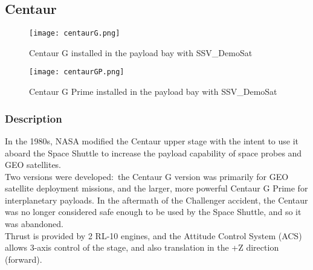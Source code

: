 \documentclass[Space_Shuttle_Vessel_Manual.tex]{subfiles}
\begin{document}
\subsection{Centaur}
\begin{multicols*}{2}
\renewcommand{\cfttoctitlefont}{\bf}
\localtableofcontents

\begin{figure}[H]
	\centering
	\captionsetup{justification=centering}
  \texttt{[image: centaurG.png]}
  \caption{Centaur G installed in the payload bay with SSV\_DemoSat}
  \label{fig:centaurG}
\end{figure}

\begin{figure}[H]
	\centering
	\captionsetup{justification=centering}
  \texttt{[image: centaurGP.png]}
  \caption{Centaur G Prime installed in the payload bay with SSV\_DemoSat}
  \label{fig:centaurGP}
\end{figure}

\subsubsection{Description}
\noindent
In the 1980s, NASA modified the Centaur upper stage with the intent to use it aboard the Space Shuttle to increase the payload capability of space probes and GEO satellites.\\

Two versions were developed$\colon$ the Centaur G version was primarily for GEO satellite deployment missions, and the larger, more powerful Centaur G Prime for interplanetary payloads. In the aftermath of the Challenger accident, the Centaur was no longer considered safe enough to be used by the Space Shuttle, and so it was abandoned.
\\
Thrust is provided by 2 RL-10 engines, and the Attitude Control System (ACS) allows 3-axis control of the stage, and also translation in the +Z direction (forward).


\end{multicols*}
\end{document}
